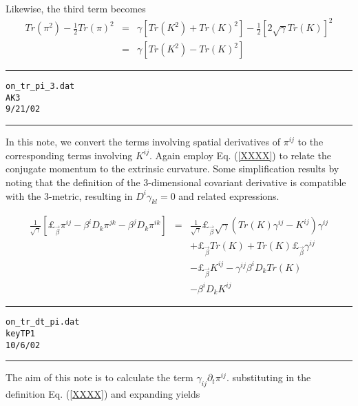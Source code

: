 \documentclass[12pt]{article}
\begin{document}
Likewise, the third term becomes
\begin{eqnarray}\label{AK2_2}
Tr( \pi ^2 ) - \frac{1}{2} Tr( \pi ) ^2 & = & \gamma \left[ Tr( K ^2 ) + Tr( K ) ^2 \right]
- \frac{1}{2} \left[ 2 \sqrt{\gamma} Tr( K ) \right] ^2 \nonumber \\
& = & \gamma \left[ Tr( K ^2 ) - Tr( K ) ^2 \right]
\end{eqnarray}
\clearpage
\vspace{5mm}
\hrule
\begin{alltt}
  on_tr_pi_3.dat
  AK3
  9/21/02
\end{alltt}
\hrule
\vspace{5mm}

In this note, we convert the terms involving spatial derivatives
of $ {\pi}^{i j} $ to the corresponding terms involving $ {K}^{i j} $.
Again employ Eq. (\ref{XXXX}) to relate the conjugate momentum to the
extrinsic curvature. Some simplification results by noting that
the definition of the 3-dimensional covariant derivative is compatible
with the 3-metric, resulting in $ D^{i} {\gamma}_{k l} = 0 $
and related expressions.

\begin{eqnarray}\label{AK3_1}
\frac{1}{ \sqrt{\gamma} } \left[ \pounds_{{\vec \beta}} {\pi}^{i j} - {\beta}^{i} D_{k} {\pi}^{j k}
- {\beta}^{j} D_{k} {\pi}^{i k} \right]
& = &
\frac{1}{ \sqrt{\gamma} } \pounds_{{\vec \beta}} \sqrt{\gamma} \left( Tr( K ) {\gamma}^{i j} - {K}^{i j} \right)
{\gamma}^{i j} \nonumber \\
&   &
+ \pounds_{{\vec \beta}} Tr( K ) + Tr( K ) \pounds_{{\vec \beta}} {\gamma}^{i j} \nonumber \\
&   &
- \pounds_{{\vec \beta}} {K}^{i j}
- {\gamma}^{i j} {\beta}^{i} D_{k} Tr( K ) \nonumber \\
&   &
- {\beta}^{i} D_{k} {K}^{i j}
\end{eqnarray}
\clearpage
\vspace{5mm}
\hrule
\begin{alltt}
  on_tr_dt_pi.dat
  key TP1
  10/6/02
\end{alltt}
\hrule
\vspace{5mm}

The aim of this note is to calculate the term $ {\gamma}_{i j} \partial_{t} {\pi}^{i j} $.
substituting in the definition Eq. (\ref{XXXX}) and expanding yields
\end{document}
